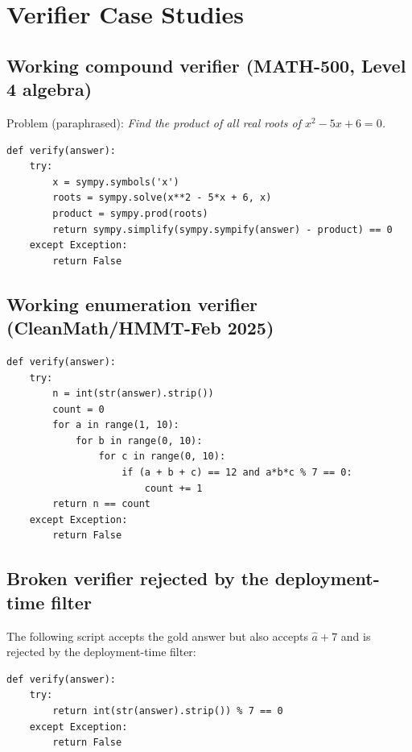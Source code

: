 \documentclass{article}
\begin{document}
\section{Verifier Case Studies}
\label{app:cases}

\subsection{Working compound verifier (MATH-500, Level 4 algebra)}

Problem (paraphrased): \emph{Find the product of all real roots of $x^2 - 5x + 6 = 0$.}

\begin{lstlisting}[style=xsgrv]
def verify(answer):
    try:
        x = sympy.symbols('x')
        roots = sympy.solve(x**2 - 5*x + 6, x)
        product = sympy.prod(roots)
        return sympy.simplify(sympy.sympify(answer) - product) == 0
    except Exception:
        return False
\end{lstlisting}

\subsection{Working enumeration verifier (CleanMath/HMMT-Feb 2025)}

\begin{lstlisting}[style=xsgrv]
def verify(answer):
    try:
        n = int(str(answer).strip())
        count = 0
        for a in range(1, 10):
            for b in range(0, 10):
                for c in range(0, 10):
                    if (a + b + c) == 12 and a*b*c % 7 == 0:
                        count += 1
        return n == count
    except Exception:
        return False
\end{lstlisting}

\subsection{Broken verifier rejected by the deployment-time filter}

The following script accepts the gold answer but also accepts $\hat a + 7$ and is rejected by the deployment-time filter:

\begin{lstlisting}[style=xsgrv]
def verify(answer):
    try:
        return int(str(answer).strip()) % 7 == 0
    except Exception:
        return False
\end{lstlisting}
\end{document}
